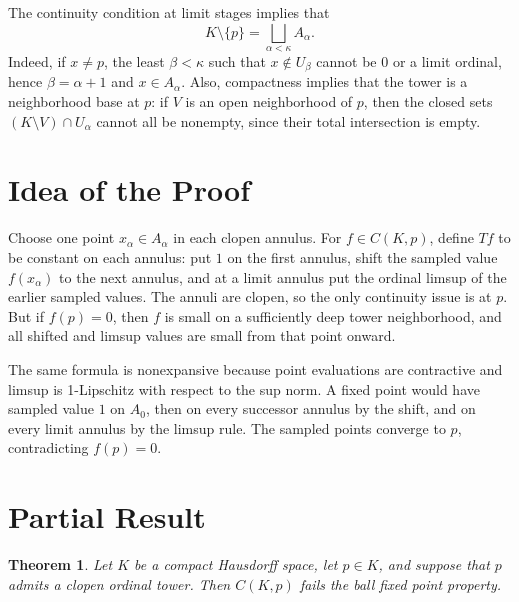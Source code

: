 \documentclass[11pt]{article}
\newtheorem{theorem}{Theorem}
\begin{document}
The continuity condition at limit stages implies that
\[
  K\setminus\{p\}=\bigsqcup_{\alpha<\kappa} A_\alpha.
\]
Indeed, if \(x\ne p\), the least \(\beta<\kappa\) such that
\(x\notin U_\beta\) cannot be \(0\) or a limit ordinal, hence
\(\beta=\alpha+1\) and \(x\in A_\alpha\).
Also, compactness implies that the tower is a neighborhood base at \(p\): if
\(V\) is an open neighborhood of \(p\), then the closed sets
\((K\setminus V)\cap U_\alpha\) cannot all be nonempty, since their total
intersection is empty.

\section*{Idea of the Proof}

Choose one point \(x_\alpha\in A_\alpha\) in each clopen annulus.  For
\(f\in C(K,p)\), define \(Tf\) to be constant on each annulus: put \(1\) on
the first annulus, shift the sampled value \(f(x_\alpha)\) to the next
annulus, and at a limit annulus put the ordinal limsup of the earlier sampled
values.  The annuli are clopen, so the only continuity issue is at \(p\).  But
if \(f(p)=0\), then \(f\) is small on a sufficiently deep tower neighborhood,
and all shifted and limsup values are small from that point onward.

The same formula is nonexpansive because point evaluations are contractive and
limsup is 1-Lipschitz with respect to the sup norm.  A fixed point would have
sampled value \(1\) on \(A_0\), then on every successor annulus by the shift,
and on every limit annulus by the limsup rule.  The sampled points converge to
\(p\), contradicting \(f(p)=0\).

\section*{Partial Result}

\begin{theorem}\label{thm:tower}
Let \(K\) be a compact Hausdorff space, let \(p\in K\), and suppose that \(p\)
admits a clopen ordinal tower.  Then \(C(K,p)\) fails the ball fixed point
property.
\end{theorem}
\end{document}
